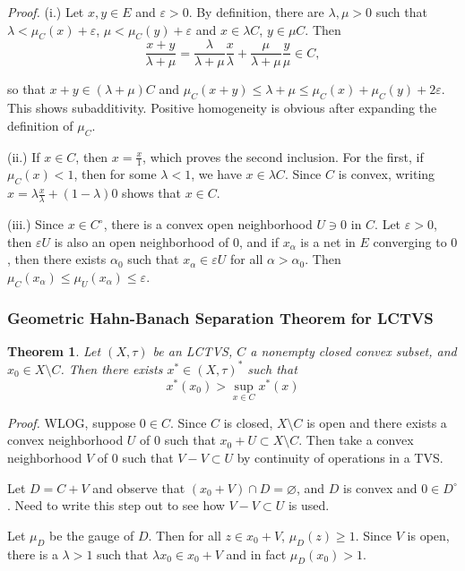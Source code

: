 \documentclass[11pt, reqno]{article}
\theoremstyle{plain}
\newtheorem*{theorem}{Theorem}
\theoremstyle{definition}
\theoremstyle{remark}
\renewcommand{\epsilon}{\varepsilon}
\renewcommand{\emptyset}{\varnothing}
\begin{document}
\textit{Proof.} (i.) Let $x, y \in E$ and $\epsilon > 0$. By definition, there are $\lambda, \mu > 0$ 
such that $\lambda < \mu_C(x) + \epsilon$, $\mu < \mu_C(y) + \epsilon$ and $x \in \lambda C$, $y \in \mu C$.
Then 
\[
    \frac{x + y}{\lambda + \mu} = \frac{\lambda}{\lambda + \mu}\frac{x}{\lambda} + \frac{\mu}{\lambda + \mu}\frac{y}{\mu} \in C,
\]

so that $x + y \in (\lambda + \mu)C$ and $\mu_C(x + y) \leq \lambda + \mu \leq \mu_C(x) + \mu_C(y) + 2\epsilon$.
This shows subadditivity. Positive homogeneity is obvious after expanding the definition of $\mu_C$. 

(ii.) If $x \in C$, then $x = \frac{x}{1}$, which proves the second inclusion. For the first, if $ \mu_C(x) < 1$,
then for some $\lambda < 1$, we have $x \in \lambda C$. Since $C$ is convex, writing $x = \lambda \frac{x}{\lambda} + (1-\lambda ) 0$
shows that $x \in C$. 

(iii.) Since $x \in C^\circ$, there is a convex open neighborhood $U \ni 0$ in $C$. Let $\epsilon > 0$, then 
$\epsilon U$ is also an open neighborhood of $0$, and if $x_\alpha$ is a net in $E$ converging to $0$, 
then there exists $\alpha_0$ such that $x_\alpha \in \epsilon U$ for all $\alpha > \alpha_0$. 
Then $\mu_C(x_\alpha) \leq \mu_U(x_\alpha) \leq \epsilon$.

\subsubsection*{Geometric Hahn-Banach Separation Theorem for LCTVS}

\begin{theorem}
    Let $(X, \tau)$ be an LCTVS, $C$ a nonempty closed convex subset, and $x_0 \in X \setminus C$. Then
    there exists $x^* \in (X,\tau)^*$ such that 
    \[
        x^*(x_0) > \sup_{x \in C} x^*(x)
    \]
\end{theorem}

\textit{Proof.} WLOG, suppose $0 \in C$. Since $C$ is closed, $X \setminus C$ is open and there exists 
a convex neighborhood $U$ of $0$ such that $x_0 + U \subset X \setminus C$. Then take a convex neighborhood 
$V$ of $0$ such that $V - V \subset U$ by continuity of operations in a TVS. 

Let $D = C + V$ and observe that $(x_0 + V) \cap D = \emptyset$, and $D$ is convex and $0 \in D^\circ$. Need 
to write this step out to see how $V - V \subset U$ is used. 

Let $\mu_D$ be the gauge of $D$. Then for all $z \in x_0 + V$, $\mu_D(z) \geq 1$. Since $V$ is open, there 
is a $\lambda > 1$ such that $\lambda x_0 \in x_0 + V$ and in fact $\mu_D(x_0) > 1$. 
\end{document}
